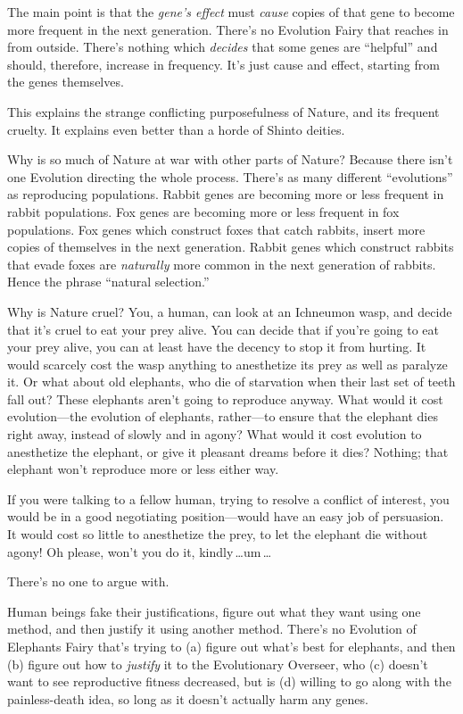  The main point is that the \textit{gene's effect}
must \textit{cause} copies of that gene to become more frequent in the
next generation. There's no Evolution Fairy that
reaches in from outside. There's nothing which
\textit{decides} that some genes are
``helpful'' and should, therefore,
increase in frequency. It's just cause and effect,
starting from the genes themselves.


 This explains the strange conflicting purposefulness of Nature,
and its frequent cruelty. It explains even better than a horde of
Shinto deities.


 Why is so much of Nature at war with other parts of Nature?
Because there isn't one Evolution directing the whole
process. There's as many different
``evolutions'' as reproducing
populations. Rabbit genes are becoming more or less frequent in rabbit
populations. Fox genes are becoming more or less frequent in fox
populations. Fox genes which construct foxes that catch rabbits, insert
more copies of themselves in the next generation. Rabbit genes which
construct rabbits that evade foxes are \textit{naturally} more common
in the next generation of rabbits. Hence the phrase
``natural selection.''


 Why is Nature cruel? You, a human, can look at an Ichneumon wasp,
and decide that it's cruel to eat your prey alive. You
can decide that if you're going to eat your prey alive,
you can at least have the decency to stop it from hurting. It would
scarcely cost the wasp anything to anesthetize its prey as well as
paralyze it. Or what about old elephants, who die of starvation when
their last set of teeth fall out? These elephants
aren't going to reproduce anyway. What would it cost
evolution---the evolution of elephants, rather---to ensure that the
elephant dies right away, instead of slowly and in agony? What would it
cost evolution to anesthetize the elephant, or give it pleasant dreams
before it dies? Nothing; that elephant won't reproduce
more or less either way.


 If you were talking to a fellow human, trying to resolve a
conflict of interest, you would be in a good negotiating
position---would have an easy job of persuasion. It would cost so
little to anesthetize the prey, to let the elephant die without agony!
Oh please, won't you do it, kindly\,\ldots um\,\ldots


 There's no one to argue with.


 Human beings fake their justifications, figure out what they want
using one method, and then justify it using another method.
There's no Evolution of Elephants Fairy
that's trying to (a) figure out what's
best for elephants, and then (b) figure out how to \textit{justify} it
to the Evolutionary Overseer, who (c) doesn't want to
see reproductive fitness decreased, but is (d) willing to go along with
the painless-death idea, so long as it doesn't actually
harm any genes.


